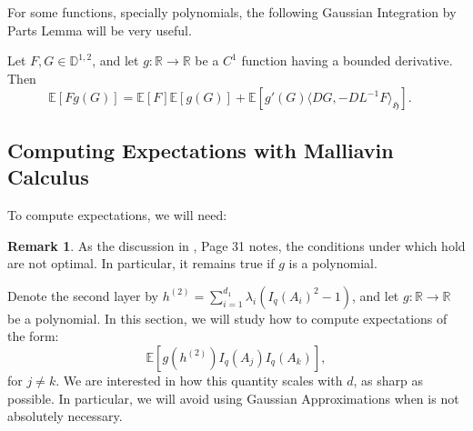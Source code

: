 \documentclass[]{article}
\numberwithin{equation}{section}
\theoremstyle{definition}
\newtheorem{remark}{Remark}[section]
\newcommand{\RR}{\mathbb{R}}
\newcommand{\EE}{\mathbb{E}}
\begin{document}
For some functions, specially polynomials, the following Gaussian Integration by Parts Lemma will be very useful. 


\begin{lemma} Let $F, G \in \mathbb{D}^{1,2}$, and let $g : \mathbb{R} \to \mathbb{R}$ be a $C^1$ function having a bounded derivative. Then
$$
\EE[Fg(G)] = \EE[F]\EE[g(G)] + \EE[g'(G)\langle DG, -DL^{-1}F \rangle_{\mathfrak{H}}]. \quad
$$
\label{lemma:gaussian_ibp}
\end{lemma}

\subsection{Computing Expectations with Malliavin Calculus}
To compute expectations, we will need: 

\begin{remark}
    As the discussion in \cite{nourdin2012normal}, Page 31 notes, the conditions under which  hold are not optimal. In particular, it remains true if $g$  is a polynomial. 
\end{remark}
Denote the second layer by $h^{(2)} = \sum_{i=1}^{d_1} \lambda_i (I_{q}(A_i)^{2} - 1)$, and let $g:\RR \to \RR$ be a polynomial. 
In this section, we will study how to compute expectations of the form: 
\begin{equation}
    \EE \left [ g(h^{(2)}) I_{q}(A_j) I_{q}(A_k)\right ],
\end{equation}
for $j \not = k$. We are interested in how this quantity scales with $d$, as sharp as possible. In particular, we will avoid using Gaussian Approximations when is not absolutely necessary. 
\end{document}
